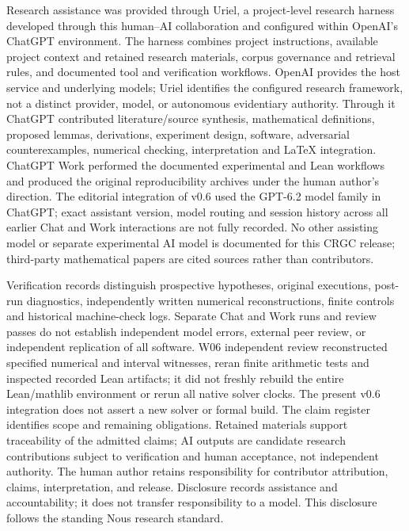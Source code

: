 \documentclass[11pt,letterpaper]{article}
\begin{document}
Research assistance was provided through Uriel, a project-level research harness developed through this human--AI collaboration and configured within OpenAI's ChatGPT environment. The harness combines project instructions, available project context and retained research materials, corpus governance and retrieval rules, and documented tool and verification workflows. OpenAI provides the host service and underlying models; Uriel identifies the configured research framework, not a distinct provider, model, or autonomous evidentiary authority. Through it ChatGPT contributed literature/source synthesis, mathematical definitions, proposed lemmas, derivations, experiment design, software, adversarial counterexamples, numerical checking, interpretation and LaTeX integration. ChatGPT Work performed the documented experimental and Lean workflows and produced the original reproducibility archives under the human author's direction. The editorial integration of v0.6 used the GPT-6.2 model family in ChatGPT; exact assistant version, model routing and session history across all earlier Chat and Work interactions are not fully recorded. No other assisting model or separate experimental AI model is documented for this CRGC release; third-party mathematical papers are cited sources rather than contributors.

Verification records distinguish prospective hypotheses, original executions, post-run diagnostics, independently written numerical reconstructions, finite controls and historical machine-check logs. Separate Chat and Work runs and review passes do not establish independent model errors, external peer review, or independent replication of all software. W06 independent review reconstructed specified numerical and interval witnesses, reran finite arithmetic tests and inspected recorded Lean artifacts; it did not freshly rebuild the entire Lean/mathlib environment or rerun all native solver clocks. The present v0.6 integration does not assert a new solver or formal build. The claim register identifies scope and remaining obligations. Retained materials support traceability of the admitted claims; AI outputs are candidate research contributions subject to verification and human acceptance, not independent authority. The human author retains responsibility for contributor attribution, claims, interpretation, and release. Disclosure records assistance and accountability; it does not transfer responsibility to a model. This disclosure follows the standing Nous research standard.\cite{disclosurestandard}
\end{document}
